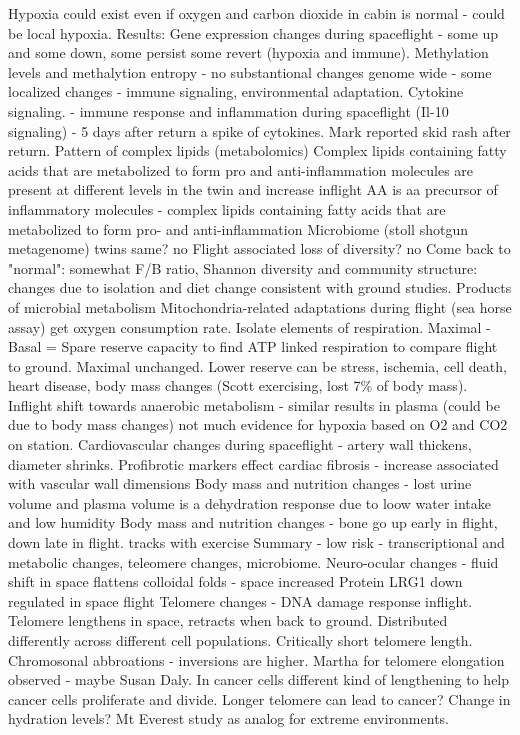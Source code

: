 \documentclass[a4paper, 11pt]{article}
\begin{document}
    Hypoxia could exist even if oxygen and carbon dioxide in cabin is normal - could be local hypoxia. 
    Results: Gene expression changes during spaceflight - some up and some down, some persist some revert (hypoxia and immune). Methylation levels and methalytion entropy - no substantional changes genome wide - some localized changes - immune signaling, environmental adaptation. 
    Cytokine signaling. - immune response and inflammation during spaceflight (Il-10 signaling)   - 5 days after return a spike of cytokines. Mark reported skid rash after return. 
    Pattern of complex lipids (metabolomics) Complex lipids containing fatty acids that are metabolized to form pro and anti-inflammation molecules are present at different levels in the twin and increase inflight 
    AA is aa precursor of inflammatory molecules - complex lipids containing fatty acids that are metabolized to form pro- and anti-inflammation
    Microbiome (stoll shotgun metagenome) twins same? no Flight associated loss of diversity? no Come back to "normal": somewhat 
    F/B ratio, Shannon diversity and community structure: changes due to isolation and diet change consistent with ground studies. 
    Products of microbial metabolism 
    Mitochondria-related adaptations during flight (sea horse assay) get oxygen consumption rate. Isolate elements of respiration. Maximal - Basal = Spare reserve capacity to find ATP linked respiration  to compare flight to ground.  Maximal unchanged. Lower reserve can be stress, ischemia, cell death, heart disease, body mass changes (Scott exercising, lost 7\% of body mass). 
    Inflight shift towards anaerobic metabolism - similar results in plasma (could be due to body mass changes) not much evidence for hypoxia based on O2 and CO2 on station. 
    Cardiovascular changes during spaceflight - artery wall thickens, diameter shrinks. Profibrotic markers effect cardiac fibrosis - increase associated with vascular wall dimensions
    Body mass and nutrition changes - lost urine volume and plasma volume is a dehydration response due to loow water intake and low humidity
    Body mass and nutrition changes - bone go up early in flight, down late in flight. tracks with exercise
    Summary - low risk - transcriptional and metabolic changes, teleomere changes, microbiome. 
    Neuro-ocular changes - fluid shift in space flattens colloidal folds - space increased Protein LRG1 down regulated in space flight 
    Telomere changes - DNA damage response inflight. Telomere lengthens in space, retracts when back to ground. Distributed differently across different cell populations. Critically short telomere length. Chromosonal abbroations - inversions are higher. Martha for telomere elongation observed - maybe Susan Daly. In cancer cells different kind of lengthening to help cancer cells proliferate and divide. Longer telomere  can lead to cancer?
    Change in hydration levels? Mt Everest study as analog for extreme environments. 
    
\end{document}
